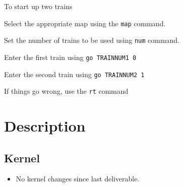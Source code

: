 \documentclass[letterpaper]{article}
\begin{document}
To start up two trains
\begin{list}{.}
{
\setlength{\rightmargin}{\leftmargin}
}

\item Select the appropriate map using the \texttt{map} command.

\item Set the number of trains to be used using \texttt{num} command.

\item Enter the first train using \texttt{go TRAINNUM1 0}

\item Enter the second train using \texttt{go TRAINNUM2 1}

\item If things go wrong, use the \texttt{rt} command
\end{list}


\section{Description%
  \label{description}%
}


\subsection{Kernel%
  \label{kernel}%
}
%
\begin{itemize}

\item No kernel changes since last deliverable.

\end{itemize}
\begin{figure}
\noindent{}
\end{figure}
\end{document}
